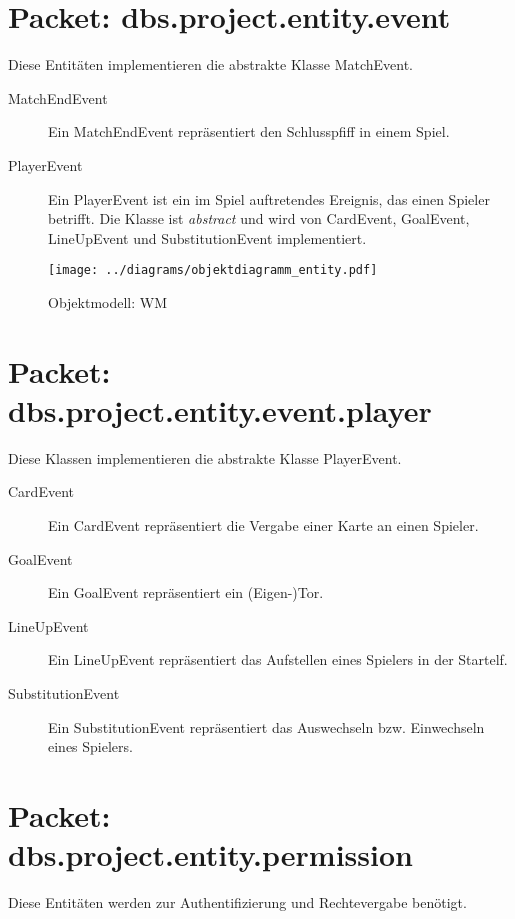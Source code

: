 \documentclass[11pt,german]{scrartcl}
\begin{document}
\section{Packet: dbs.project.entity.event}
Diese Entitäten implementieren die abstrakte Klasse MatchEvent.

\begin{description}

\item [MatchEndEvent]
Ein MatchEndEvent repräsentiert den Schlusspfiff in einem Spiel.

\item [PlayerEvent]
Ein PlayerEvent ist ein im Spiel auftretendes Ereignis, das einen Spieler betrifft. Die Klasse ist {\it abstract} und wird von CardEvent, GoalEvent, LineUpEvent und SubstitutionEvent implementiert.

\end{description}

\begin{figure}[htb]
\begin{center}
\leavevmode
\texttt{[image: ../diagrams/objektdiagramm\_entity.pdf]}
\end{center}
\caption{Objektmodell: WM}
\label{fig:entities}
\end{figure}



\section{Packet: dbs.project.entity.event.player}
Diese Klassen implementieren die abstrakte Klasse PlayerEvent.

\begin{description}
\item [CardEvent]
Ein CardEvent repräsentiert die Vergabe einer Karte an einen Spieler.

\item [GoalEvent]
Ein GoalEvent repräsentiert ein (Eigen-)Tor.

\item [LineUpEvent]
Ein LineUpEvent repräsentiert das Aufstellen eines Spielers in der Startelf.

\item [SubstitutionEvent]
Ein SubstitutionEvent repräsentiert das Auswechseln bzw. Einwechseln eines Spielers.
\end{description}

\section{Packet: dbs.project.entity.permission}
Diese Entitäten werden zur Authentifizierung und Rechtevergabe benötigt.
\end{document}
